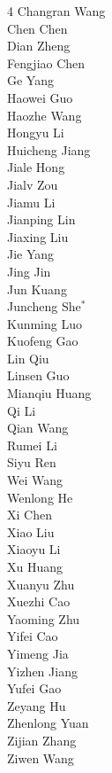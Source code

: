 \documentclass{article}
\begin{document}
\begin{multicols}{4}
\small
Changran Wang\\
Chen Chen\\
Dian Zheng\\
Fengjiao Chen\\
Ge Yang\\
Haowei Guo\\
Haozhe Wang\\
Hongyu Li\\
Huicheng Jiang\\
Jiale Hong\\
Jialv Zou\\
Jiamu Li\\
Jianping Lin\\
Jiaxing Liu\\
Jie Yang\\
Jing Jin\\
Jun Kuang\\
Juncheng She$^*$\\
Kunming Luo\\
Kuofeng Gao\\
Lin Qiu\\
Linsen Guo\\
Mianqiu Huang\\
Qi Li\\
Qian Wang\\
Rumei Li\\
Siyu Ren\\
Wei Wang\\
Wenlong He\\
Xi Chen\\
Xiao Liu\\
Xiaoyu Li\\
Xu Huang\\
Xuanyu Zhu\\
Xuezhi Cao\\
Yaoming Zhu\\
Yifei Cao\\
Yimeng Jia\\
Yizhen Jiang\\
Yufei Gao\\
Zeyang Hu\\
Zhenlong Yuan\\
Zijian Zhang\\
Ziwen Wang
\end{multicols}


\clearpage
% 
%   
\printbibliography





\end{document}
